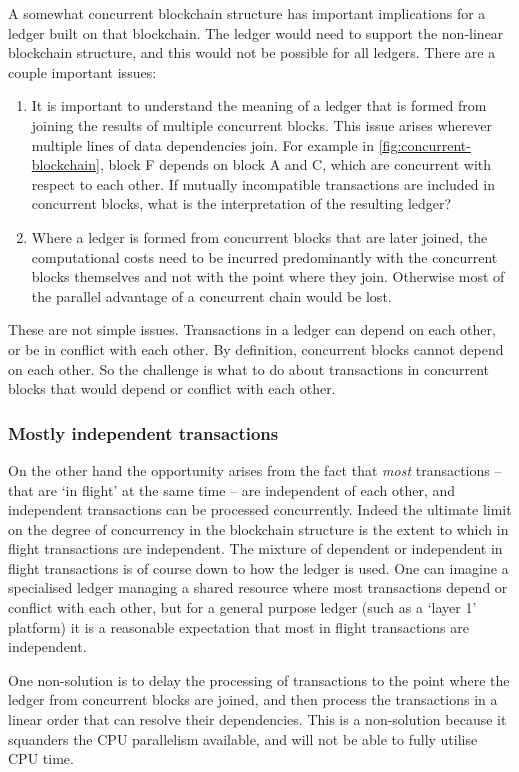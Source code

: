 \documentclass[11pt,a4paper]{article}
\begin{document}
A somewhat concurrent blockchain structure has important implications for a
ledger built on that blockchain. The ledger would need to support the non-linear
blockchain structure, and this would not be possible for all ledgers. There are
a couple important issues:
\begin{enumerate}
\item It is important to understand the meaning of a ledger that is formed
      from joining the results of multiple concurrent blocks. This issue
      arises wherever multiple lines of data dependencies join. For example
      in \cref{fig:concurrent-blockchain}, block F depends on block A and C,
      which are concurrent with respect to each other. If mutually incompatible
      transactions are included in concurrent blocks, what is the interpretation
      of the resulting ledger?
\item Where a ledger is formed from concurrent blocks that are later joined,
      the computational costs need to be incurred predominantly with the
      concurrent blocks themselves and not with the point where they join.
      Otherwise most of the parallel advantage of a concurrent chain would be
      lost.
\end{enumerate}
These are not simple issues. Transactions in a ledger can depend on each other,
or be in conflict with each other. By definition, concurrent blocks cannot
depend on each other. So the challenge is what to do about transactions in
concurrent blocks that would depend or conflict with each other.

\subsubsection{Mostly independent transactions}
On the other hand the opportunity arises from the fact that \emph{most}
transactions -- that are `in flight' at the same time -- are independent of each
other, and independent transactions can be processed concurrently. Indeed the
ultimate limit on the degree of concurrency in the blockchain structure is the
extent to which in flight transactions are independent. The mixture of dependent
or independent in flight transactions is of course down to how the ledger is
used. One can imagine a specialised ledger managing a shared resource where most
transactions depend or conflict with each other, but for a general purpose
ledger (such as a `layer 1' platform) it is a reasonable expectation that most
in flight transactions are independent.

One non-solution is to delay the processing of transactions to the point where
the ledger from concurrent blocks are joined, and then process the transactions
in a linear order that can resolve their dependencies. This is a non-solution
because it squanders the CPU parallelism available, and will not be able to
fully utilise CPU time.
\end{document}
